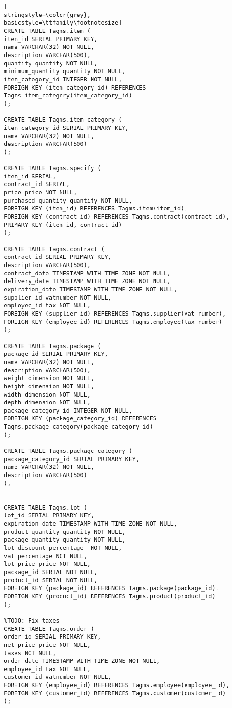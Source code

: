 \begin{lstlisting}[
stringstyle=\color{grey},
basicstyle=\ttfamily\footnotesize]
CREATE TABLE Tagms.item (
item_id SERIAL PRIMARY KEY,
name VARCHAR(32) NOT NULL,
description VARCHAR(500),
quantity quantity NOT NULL,
minimum_quantity quantity NOT NULL,
item_category_id INTEGER NOT NULL,
FOREIGN KEY (item_category_id) REFERENCES Tagms.item_category(item_category_id)
);

CREATE TABLE Tagms.item_category (
item_category_id SERIAL PRIMARY KEY,
name VARCHAR(32) NOT NULL,
description VARCHAR(500)
);

CREATE TABLE Tagms.specify (
item_id SERIAL,
contract_id SERIAL,
price price NOT NULL,
purchased_quantity quantity NOT NULL,
FOREIGN KEY (item_id) REFERENCES Tagms.item(item_id),
FOREIGN KEY (contract_id) REFERENCES Tagms.contract(contract_id),
PRIMARY KEY (item_id, contract_id)
);

CREATE TABLE Tagms.contract (
contract_id SERIAL PRIMARY KEY,
description VARCHAR(500),
contract_date TIMESTAMP WITH TIME ZONE NOT NULL,
delivery_date TIMESTAMP WITH TIME ZONE NOT NULL,
expiration_date TIMESTAMP WITH TIME ZONE NOT NULL,
supplier_id vatnumber NOT NULL,
employee_id tax NOT NULL,
FOREIGN KEY (supplier_id) REFERENCES Tagms.supplier(vat_number),
FOREIGN KEY (employee_id) REFERENCES Tagms.employee(tax_number)
);

CREATE TABLE Tagms.package (
package_id SERIAL PRIMARY KEY,
name VARCHAR(32) NOT NULL,
description VARCHAR(500),
weight dimension NOT NULL,
height dimension NOT NULL,
width dimension NOT NULL,
depth dimension NOT NULL,
package_category_id INTEGER NOT NULL,
FOREIGN KEY (package_category_id) REFERENCES Tagms.package_category(package_category_id)
);

CREATE TABLE Tagms.package_category (
package_category_id SERIAL PRIMARY KEY,
name VARCHAR(32) NOT NULL,
description VARCHAR(500)
);


CREATE TABLE Tagms.lot (
lot_id SERIAL PRIMARY KEY,
expiration_date TIMESTAMP WITH TIME ZONE NOT NULL,
product_quantity quantity NOT NULL,
package_quantity quantity NOT NULL,
lot_discount percentage  NOT NULL,
vat percentage NOT NULL,
lot_price price NOT NULL,
package_id SERIAL NOT NULL,
product_id SERIAL NOT NULL,
FOREIGN KEY (package_id) REFERENCES Tagms.package(package_id),
FOREIGN KEY (product_id) REFERENCES Tagms.product(product_id)
);

%TODO: Fix taxes
CREATE TABLE Tagms.order (
order_id SERIAL PRIMARY KEY,
net_price price NOT NULL,
taxes NOT NULL,
order_date TIMESTAMP WITH TIME ZONE NOT NULL,
employee_id tax NOT NULL,
customer_id vatnumber NOT NULL,
FOREIGN KEY (employee_id) REFERENCES Tagms.employee(employee_id),
FOREIGN KEY (customer_id) REFERENCES Tagms.customer(customer_id)
);


\end{lstlisting}

